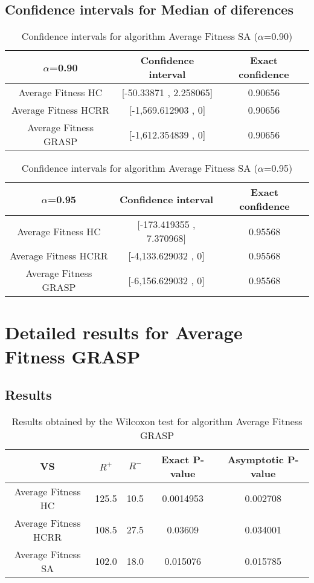 \documentclass[a4paper,10pt]{article}
\begin{document}
\subsection{Confidence intervals for Median of diferences}

\begin{table}[!htp]
\centering\small
\begin{tabular}{
|c|c|c|}
\hline
 $\alpha$=0.90 & Confidence interval & Exact confidence \\ \hline 
Average Fitness HC       & [-50.33871 , 2.258065] & 0.90656\\ \hline 
Average Fitness HCRR    & [-1,569.612903 , 0] & 0.90656\\ \hline 
Average Fitness GRASP & [-1,612.354839 , 0] & 0.90656\\ \hline 

\end{tabular}
\caption{Confidence intervals for algorithm Average Fitness SA      ($\alpha$=0.90)}
\end{table}
\begin{table}[!htp]
\centering\small
\begin{tabular}{
|c|c|c|}
\hline
 $\alpha$=0.95 & Confidence interval & Exact confidence \\ \hline 
Average Fitness HC       & [-173.419355 , 7.370968] & 0.95568\\ \hline 
Average Fitness HCRR    & [-4,133.629032 , 0] & 0.95568\\ \hline 
Average Fitness GRASP & [-6,156.629032 , 0] & 0.95568\\ \hline 

\end{tabular}
\caption{Confidence intervals for algorithm Average Fitness SA      ($\alpha$=0.95)}
\end{table}

 \clearpage 


\section{Detailed results for Average Fitness GRASP}


\subsection{Results}

\begin{table}[!htp]
\centering\small
\begin{tabular}{
|c|c|c|c|c|}
\hline
 VS & $R^{+}$ & $R^{-}$ & Exact P-value & Asymptotic P-value \\ \hline 
Average Fitness HC       & 125.5 & 10.5 & 0.0014953 & 0.002708\\ \hline 
Average Fitness HCRR    & 108.5 & 27.5 & 0.03609 & 0.034001\\ \hline 
Average Fitness SA      & 102.0 & 18.0 & 0.015076 & 0.015785\\ \hline 

\end{tabular}
\caption{Results obtained by the Wilcoxon test for algorithm Average Fitness GRASP}
\end{table}
\end{document}
